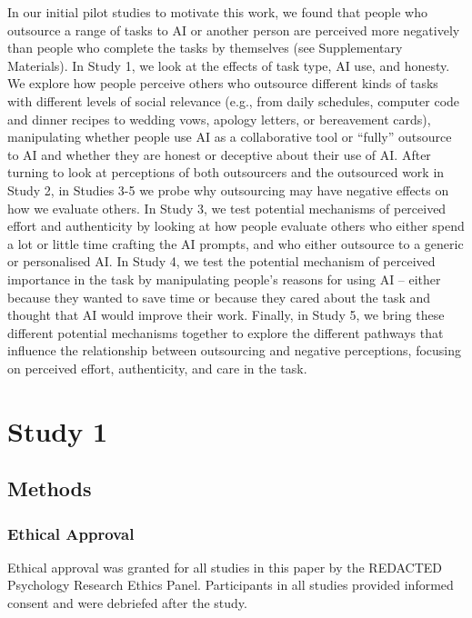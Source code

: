 \documentclass[
  man,
  floatsintext,
  longtable,
  nolmodern,
  notxfonts,
  notimes,
  colorlinks=true,linkcolor=blue,citecolor=blue,urlcolor=blue]{apa7}
\begin{document}
In our initial pilot studies to motivate this work, we found that people
who outsource a range of tasks to AI or another person are perceived
more negatively than people who complete the tasks by themselves (see
Supplementary Materials). In Study 1, we look at the effects of task
type, AI use, and honesty. We explore how people perceive others who
outsource different kinds of tasks with different levels of social
relevance (e.g., from daily schedules, computer code and dinner recipes
to wedding vows, apology letters, or bereavement cards), manipulating
whether people use AI as a collaborative tool or ``fully'' outsource to
AI and whether they are honest or deceptive about their use of AI. After
turning to look at perceptions of both outsourcers and the outsourced
work in Study 2, in Studies 3-5 we probe why outsourcing may have
negative effects on how we evaluate others. In Study 3, we test
potential mechanisms of perceived effort and authenticity by looking at
how people evaluate others who either spend a lot or little time
crafting the AI prompts, and who either outsource to a generic or
personalised AI. In Study 4, we test the potential mechanism of
perceived importance in the task by manipulating people's reasons for
using AI -- either because they wanted to save time or because they
cared about the task and thought that AI would improve their work.
Finally, in Study 5, we bring these different potential mechanisms
together to explore the different pathways that influence the
relationship between outsourcing and negative perceptions, focusing on
perceived effort, authenticity, and care in the task.

\newpage

\section*{Study 1}\label{study-1}

\subsection*{Methods}\label{methods}

\subsubsection*{Ethical Approval}\label{ethical-approval}

Ethical approval was granted for all studies in this paper by the
REDACTED Psychology Research Ethics Panel. Participants in all studies
provided informed consent and were debriefed after the study.
\end{document}
